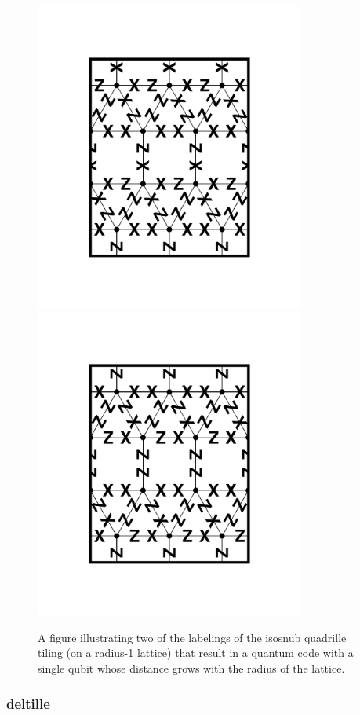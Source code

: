 \documentclass[twocolumn,showpacs,preprintnumbers,amsmath,amssymb,nofootinbib,pra,floatfix]{revtex4-1}
\begin{document}
\begin{figure}
\includegraphics[width=3.5in]{isosnub-quadrille-code-labeling-1} %
\includegraphics[width=3.5in]{isosnub-quadrille-code-labeling-2} %
\caption{
\label{figure:isosnub-quadrille-code-r-labeling}
A figure illustrating two of the labelings of the isosnub quadrille tiling (on a radius-1 lattice) that result in a quantum code with a single qubit whose distance grows with the radius of the lattice.
}
\end{figure}
\subsubsection{deltille}
\end{document}
